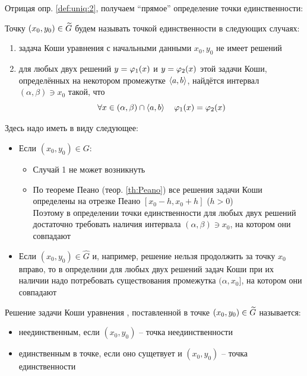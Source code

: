 Отрицая опр. \ref{def:uniq:2}, получаем ``прямое'' определение точки единственности:
\begin{definition}
    Точку $ (x_0, y_0) \in \widetilde{G} $ будем называть точкой единственности в следующих случаях:
    \begin{enumerate}
        \item задача Коши уравнения  с начальными данными $ x_0, y_0 $ не имеет решений
        \item для любых двух решений $ y = \varphi_1(x) $ и $ y = \varphi_2(x) $ этой задачи Коши, определённых на некотором промежутке $ \Braket{a, b} $, найдётся интервал $ (\alpha, \beta) \ni x_0 $ такой, что
        $$ \forall x \in (\alpha, \beta) \cap \Braket{a, b} \quad \varphi_1(x) = \varphi_2(x) $$
    \end{enumerate}
\end{definition}

\begin{note}
	Здесь надо иметь в виду следующее:
    \begin{itemize}
    	\item Если $ (x_0, y_0) \in G $:
        \begin{itemize}
        	\item Случай 1 не может возникнуть
            \item По теореме Пеано (теор. \ref{th:Peano}) все решения задачи Коши определены на отрезке Пеано $ [x_0 - h, x_0 + h] $ ($ h > 0 $) \\
            Поэтому в определении точки единственности для любых двух решений достаточно требовать наличия интервала $ (\alpha, \beta) \ni x_0 $, на котором они совпадают
        \end{itemize}
        \item Если $ (x_0, y_0) \in \hat{G} $ и, например, решение нельзя продолжить за точку $ x_0 $ вправо, то в определнии для любых двух решений задач Коши при их наличии надо потребовать существования промежутка $ (\alpha, x_0] $, на котором они совпадают
    \end{itemize}
\end{note}

\begin{definition}
    Решение задачи Коши уравнения , поставленной в точке $ (x_0, y_0) \in \widetilde{G} $ называется:
    \begin{itemize}
    	\item неединственным, если $ (x_0, y_0) $ -- точка неединственности
        \item единственным в точке, если оно сущетвует и $ (x_0, y_0) $ -- точка единственности
    \end{itemize}
\end{definition}

